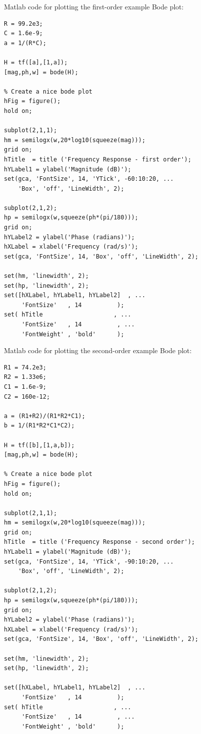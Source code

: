 \newpage
Matlab code for plotting the first-order example Bode plot:
\begin{verbatim}
R = 99.2e3;
C = 1.6e-9;
a = 1/(R*C);

H = tf([a],[1,a]);
[mag,ph,w] = bode(H);

% Create a nice bode plot 
hFig = figure();
hold on;

subplot(2,1,1);
hm = semilogx(w,20*log10(squeeze(mag)));
grid on;
hTitle  = title ('Frequency Response - first order');
hYLabel1 = ylabel('Magnitude (dB)');
set(gca, 'FontSize', 14, 'YTick', -60:10:20, ...
    'Box', 'off', 'LineWidth', 2);

subplot(2,1,2);
hp = semilogx(w,squeeze(ph*(pi/180)));
grid on;
hYLabel2 = ylabel('Phase (radians)');
hXLabel = xlabel('Frequency (rad/s)');
set(gca, 'FontSize', 14, 'Box', 'off', 'LineWidth', 2);

set(hm, 'linewidth', 2);
set(hp, 'linewidth', 2);
set([hXLabel, hYLabel1, hYLabel2]  , ...
     'FontSize'   , 14          );
set( hTitle                    , ...
     'FontSize'   , 14          , ...
     'FontWeight' , 'bold'      );
\end{verbatim}

\newpage
Matlab code for plotting the second-order example Bode plot:
\begin{verbatim}
R1 = 74.2e3;
R2 = 1.33e6;
C1 = 1.6e-9;
C2 = 160e-12;

a = (R1+R2)/(R1*R2*C1);
b = 1/(R1*R2*C1*C2);

H = tf([b],[1,a,b]);
[mag,ph,w] = bode(H);

% Create a nice bode plot 
hFig = figure();
hold on;

subplot(2,1,1);
hm = semilogx(w,20*log10(squeeze(mag)));
grid on;
hTitle  = title ('Frequency Response - second order');
hYLabel1 = ylabel('Magnitude (dB)');
set(gca, 'FontSize', 14, 'YTick', -90:10:20, ...
    'Box', 'off', 'LineWidth', 2);

subplot(2,1,2);
hp = semilogx(w,squeeze(ph*(pi/180)));
grid on;
hYLabel2 = ylabel('Phase (radians)');
hXLabel = xlabel('Frequency (rad/s)');
set(gca, 'FontSize', 14, 'Box', 'off', 'LineWidth', 2);

set(hm, 'linewidth', 2);
set(hp, 'linewidth', 2);

set([hXLabel, hYLabel1, hYLabel2]  , ...
     'FontSize'   , 14          );
set( hTitle                    , ...
     'FontSize'   , 14          , ...
     'FontWeight' , 'bold'      );
\end{verbatim}

